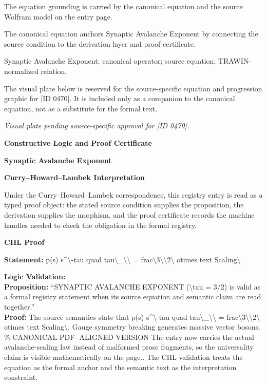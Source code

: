 The equation grounding is carried by the canonical equation and the source Wolfram model on the entry page.

The canonical equation anchors Synaptic Avalanche Exponent by connecting the source condition to the derivation layer and proof certificate.

Synaptic Avalanche Exponent; canonical operator; source equation; TRAWIN-normalized relation.
\endgroup

\begingroup\footnotesize\sloppy
The visual plate below is reserved for the source-specific equation and progression graphic for [ID 0470]. It is included only as a companion to the canonical equation, not as a substitute for the formal text.
\par\endgroup
\begingroup\footnotesize\itshape
Visual plate pending source-specific approval for [ID 0470].
\par\endgroup

\clearpage
\begingroup\tzpsupportsetup
\noindent\textbf{\fontsize{10.8pt}{12.8pt}\selectfont [ID 0470] Constructive Logic and Proof Certificate}\par
\noindent\textbf{\fontsize{10pt}{12pt}\selectfont Synaptic Avalanche Exponent}\par
\vspace{0.45em}
\begingroup
\footnotesize
\setlength{\parskip}{0.22em}
\setlength{\parindent}{0pt}
\noindent\textbf{Curry--Howard--Lambek Interpretation}\par
Under the Curry--Howard--Lambek correspondence, this registry entry is read as a typed proof
object: the stated source condition supplies the proposition, the derivation supplies the
morphism, and the proof certificate records the machine handles needed to check the obligation
in the formal registry.

\vspace{0.45em}
\noindent\textbf{CHL Proof}\par
\textbf{Statement:} p(s) s\textasciicircum{}\textbackslash{}-tau quad tau\textbackslash{}\_\textbackslash{}\textbackslash{} = frac\textbackslash{}3\textbackslash{}\textbackslash{}2\textbackslash{} otimes text Scaling\textbackslash{}

\textbf{Logic Validation:}\\
\textbf{Proposition:} ``SYNAPTIC AVALANCHE EXPONENT (\textbackslash{}tau = 3/2) is valid as a formal registry statement when
its source equation and semantic claim are read together.''\\
\textbf{Proof:} The source semantics state that p(s) s\textasciicircum{}\textbackslash{}-tau quad tau\textbackslash{}\_\textbackslash{}\textbackslash{} = frac\textbackslash{}3\textbackslash{}\textbackslash{}2\textbackslash{} otimes text
Scaling\textbackslash{}. Gauge symmetry breaking generates massive vector bosons. \% CANONICAL PDF-
ALIGNED VERSION The entry now carries the actual avalanche-scaling law instead of
malformed prose fragments, so the universality claim is visible mathematically on the
page.. The CHL validation treats the equation as the formal anchor and the semantic text
as the interpretation constraint.

